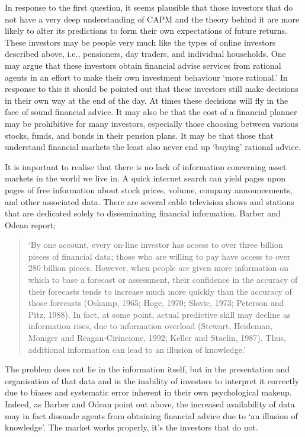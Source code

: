 \documentclass{ucthesis}
\begin{document}
In response to the first question, it seems plausible that those investors
that do not have a very deep understanding of CAPM and the theory behind it
are more likely to alter its predictions to form their own expectations of
future returns. These investors may be people very much like the types of
online investors described above, i.e., pensioners, day traders, and
individual households. One may argue that these investors obtain financial
advise services from rational agents in an effort to make their own
investment behaviour `more rational.' In response to this it should be
pointed out that these investors still make decisions in their own way at
the end of the day. At times these decisions will fly in the face of sound
financial advice. It may also be that the cost of a financial planner may be
prohibitive for many investors, especially those choosing between various
stocks, funds, and bonds in their pension plans. It may be that those that
understand financial markets the least also never end up `buying' rational
advice.

It is important to realise that there is no lack of information concerning
asset markets in the world we live in. A quick internet search can yield
pages upon pages of free information about stock prices, volume, company
announcements, and other associated data. There are several cable television
shows and stations that are dedicated solely to disseminating financial
information. Barber and Odean \cite[2001]{Barber 2001} report;

\begin{quote}
`By one account, every on-line investor has access to over three billion
pieces of financial data; those who are willing to pay have access to over
280 billion pieces. However, when people are given more information on which
to base a forecast or assessment, their confidence in the accuracy of their
forecasts tends to increase much more quickly than the accuracy of those
forecasts (Oskamp, 1965; Hoge, 1970; Slovic, 1973; Peterson and Pitz, 1988).
In fact, at some point, actual predictive skill may decline as information
rises, due to information overload (Stewart, Heideman, Moniger and
Reagan-Cirincione, 1992; Keller and Staelin, 1987). Thus, additional
information can lead to an illusion of knowledge.' \cite[pp. 46]{Barber 2001}
\end{quote}

The problem does not lie in the information itself, but in the presentation
and organisation of that data and in the inability of investors to interpret
it correctly due to biases and systematic error inherent in their own
psychological makeup. Indeed, as Barber and Odean point out above, the
increased availability of data may in fact dissuade agents from obtaining
financial advice due to `an illusion of knowledge'. The market works
properly, it's the investors that do not.
\end{document}
